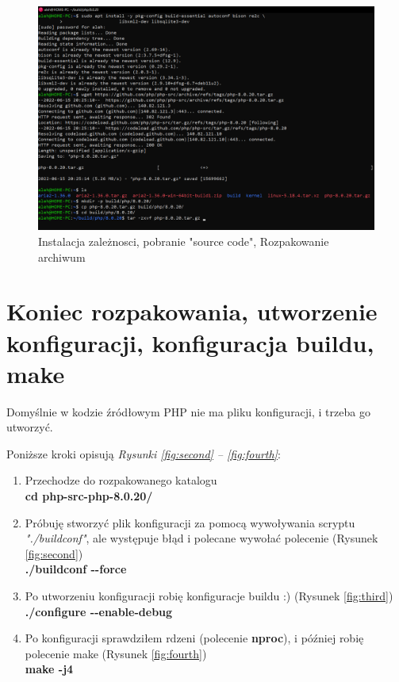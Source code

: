 \documentclass[a4paper,12pt,oneside]{report} %
\begin{document}
\begin{figure}[hb]
    \includegraphics[width=16cm]{e6.png}
	\caption{Instalacja zależnosci, pobranie "source code", Rozpakowanie archiwum }
    \label{fig:first}
\end{figure}


\section{Koniec rozpakowania, utworzenie konfiguracji, konfiguracja buildu, make}

Domyślnie w kodzie źródłowym PHP nie ma pliku konfiguracji, i trzeba go utworzyć.

Poniższe kroki opisują \textit{Rysunki \ref{fig:second} -- \ref{fig:fourth}}:

\begin{enumerate}
    \item Przechodze do rozpakowanego katalogu \\ \textbf{cd php-src-php-8.0.20/}
    \item Próbuję stworzyć plik konfiguracji za pomocą wywoływania scryptu \textit{"./buildconf"}, ale występuje błąd i polecane wywołać polecenie (Rysunek \ref{fig:second}) \\ \textbf{./buildconf -{}-force}
    \item Po utworzeniu konfiguracji robię konfiguracje buildu :) (Rysunek \ref{fig:third})  \\ \textbf{ ./configure -{}-enable-debug}
    \item Po konfiguracji sprawdziłem rdzeni (polecenie \textbf{nproc}), i później robię polecenie make  (Rysunek \ref{fig:fourth}) \\ \textbf{ make -j4}
\end{enumerate}
\end{document}
